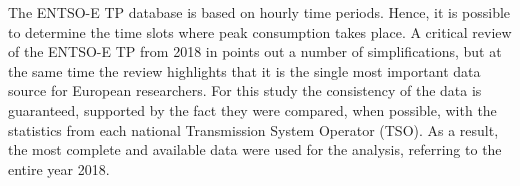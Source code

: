 The ENTSO-E TP database is based on hourly time periods. Hence, it is possible to determine the time slots where peak consumption takes place. A critical review of the ENTSO-E TP from 2018 in \cite{Hirth2018ThePlatform} points out a number of simplifications, but at the same time the review highlights that it is the single most important data source for European researchers. For this study the consistency of the data is guaranteed, supported by the fact they were compared, when possible, with the statistics from each national Transmission System Operator (TSO). As a result, the most complete and available data were used for the analysis, referring to the entire year 2018.  %





